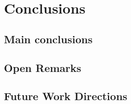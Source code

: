 
\chapter{Conclusions}
\label{cha:conclusions}

\section{Main conclusions}
\label{sec:main_conclusion}

\section{Open Remarks}
\label{sec:open_remarks}

\section{Future Work Directions}
\label{sec:future_work_directions}
